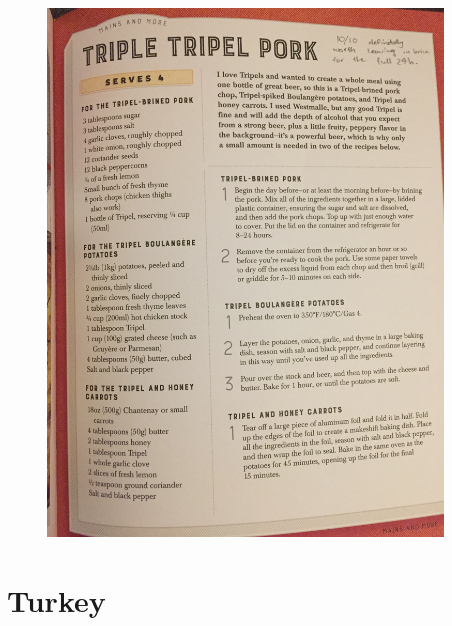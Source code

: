 \documentclass[18pt, oneside]{book}
\begin{document}
\begin{figure}[h!]
  \begin{center}
  \includegraphics[height = 14cm, angle=270]{TripelPark}
  \end{center}
\end{figure}

\chapter{Turkey}
\end{document}

